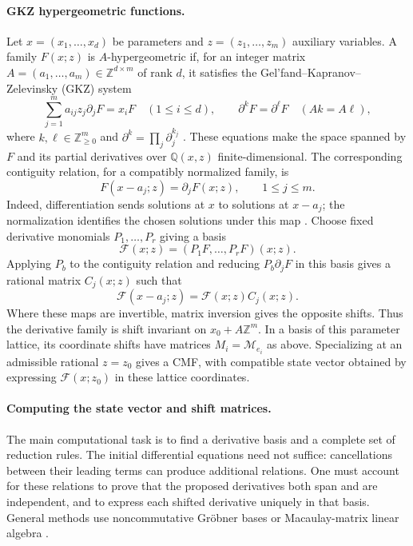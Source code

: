 \documentclass[oneside,english,11pt]{amsart}
\begin{document}
\paragraph{GKZ hypergeometric functions.}
Let $x=(x_1,\ldots,x_d)$ be parameters and
$z=(z_1,\ldots,z_m)$ auxiliary variables.  A family $F(x;z)$ is
$A$-hypergeometric if, for an integer matrix
$A=(a_1,\ldots,a_m)\in\mathbb Z^{d\times m}$ of rank $d$, it
satisfies the Gel'fand--Kapranov--Zelevinsky (GKZ) system
\[
 \sum_{j=1}^m a_{ij}z_j\partial_jF=x_iF
 \quad(1\le i\le d),\qquad
 \partial^kF=\partial^\ell F\quad(Ak=A\ell),
\]
where $k,\ell\in\mathbb Z_{\ge0}^m$ and
$\partial^k=\prod_j\partial_j^{k_j}$
\cite{gelfandKapranovZelevinsky1990,saitoSturmfelsTakayama2000}.
These equations make the space spanned by $F$ and its partial
derivatives over $\mathbb Q(x,z)$ finite-dimensional.
The corresponding contiguity relation, for a compatibly normalized
family, is
\[
 F(x-a_j;z)=\partial_jF(x;z),\qquad 1\le j\le m.
\]
Indeed, differentiation sends solutions at $x$ to solutions at
$x-a_j$; the normalization identifies the chosen solutions under
this map \cite[Section~2.5]{reicheltSchulzeSevenheckWalther2021}.
Choose fixed derivative monomials $P_1,\ldots,P_r$ giving a basis
\[
 \mathcal F(x;z)=(P_1F,\ldots,P_rF)(x;z).
\]
Applying $P_b$ to the contiguity relation and reducing
$P_b\partial_jF$ in this basis gives a rational matrix $C_j(x;z)$
such that
\[
 \mathcal F(x-a_j;z)=\mathcal F(x;z)C_j(x;z).
\]
Where these maps are invertible, matrix inversion gives the opposite
shifts. Thus the derivative family is shift invariant on
$x_0+A\mathbb Z^m$. In a basis of this parameter lattice, its
coordinate shifts have matrices $M_i=\mathcal M_{e_i}$ as above.
Specializing at an admissible rational $z=z_0$ gives a CMF, with
compatible state vector obtained by expressing
$\mathcal F(x;z_0)$ in these lattice coordinates.

\paragraph{Computing the state vector and shift matrices.}
The main computational task is to find a derivative basis and a
complete set of reduction rules. The initial differential equations
need not suffice: cancellations between their leading terms can
produce additional relations.  One must account for these relations
to prove that the proposed derivatives both span and are independent,
and to express each shifted derivative uniquely in that basis.
General methods use noncommutative Gr\"obner bases
\cite{saitoSturmfelsTakayama2000} or Macaulay-matrix linear algebra
\cite{OharaTakayama2015,Chestnov2022Macaulay}.
\end{document}
